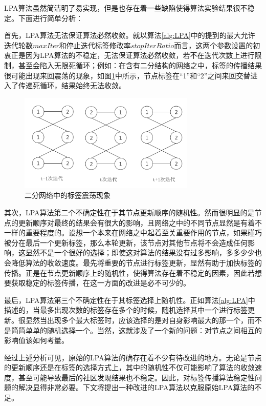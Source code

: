 LPA算法虽然简洁明了易实现，但是也存在着一些缺陷使得算法实验结果很不稳定。下面进行简单分析：

首先，LPA算法无法保证算法必然收敛。就以算法\ref{alg:LPA}中的提到的最大允许迭代轮数$maxIter$和停止迭代标签修改率$stopIterRatio$而言，这两个参数设置的初衷正是因为LPA算法的不稳定，无法保证算法必然收敛，若不在迭代次数上进行限制，甚至会陷入无限死循环；例如：在含有二分结构的网络之中，标签的传播结果很可能出现来回震荡的现象，如图\ref{fig:fig3-1}中所示，节点标签在“1”和“2”之间来回交替进入了传递死循环，结果始终无法收敛。

\begin{figure}
  \centering
  \includegraphics[width=0.75\textwidth]{figures/fig3-1}
  \caption{二分网络中的标签震荡现象}\label{fig:fig3-1}
 \end{figure}

其次，LPA算法第二个不确定性在于其节点更新顺序的随机性。然而很明显的是节点的更新顺序对最终的结果会有很大的影响，且网络之中的不同节点显然是有着不一样的重要程度的。设想一个本来在网络之中起着至关重要作用的节点，如果碰巧被分在最后一个更新标签，那么本轮更新，该节点对其他节点将不会造成任何影响，这显然不是一个很好的选择；即使这对算法的结果没有过多影响，多多少少也会降低算法的收敛速度。最先将重要的节点进行标签更新，显然有助于加快标签的传播。正是在节点更新顺序上的随机性，使得算法存在着不稳定的因素，因此若想要获取稳定的标签传播，在这一方面的改进是必不可少的。

最后，LPA算法第三个不确定性在于其标签选择上随机性。正如算法\ref{alg:LPA}中描述的，当最多出现次数的标签存在多个的时候，随机选择其中一个进行标签更新。很显然当出现多个最大标签时，应该选择的是对自身影响最大的那一个，而不是简简单单的随机选择一个。当然，这就涉及了一个新的问题：对节点之间相互的影响值该如何考量。

经过上述分析可见，原始的LPA算法的确存在着不少有待改进的地方。无论是节点的更新顺序还是在标签的选择方式上，其中的随机性不仅可能影响了算法的收敛速度，甚至可能导致最后的社区发现结果也不稳定。因此，对标签传播算法稳定性问题的解决显得非常必要。下文将提出一种改进的LPA算法以克服原始LPA算法的不足。

